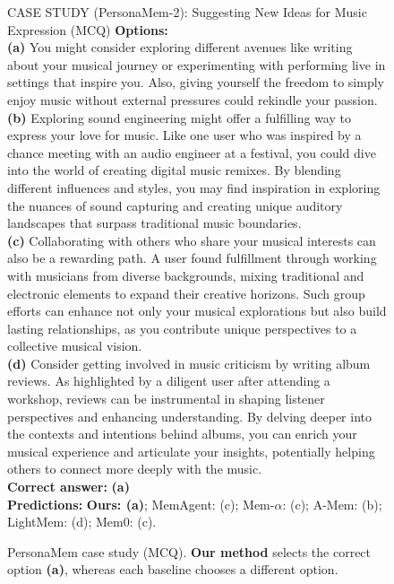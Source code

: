 \begin{figure}[!t]
\begin{AIboxRedFrame}{CASE STUDY (PersonaMem-2): Suggesting New Ideas for Music Expression (MCQ)}
{\textbf{Options:} \\
\textbf{(a)} You might consider exploring different avenues like writing about your musical journey or experimenting with performing live in settings that inspire you. Also, giving yourself the freedom to simply enjoy music without external pressures could rekindle your passion. \\
\textbf{(b)} Exploring sound engineering might offer a fulfilling way to express your love for music. Like one user who was inspired by a chance meeting with an audio engineer at a festival, you could dive into the world of creating digital music remixes. By blending different influences and styles, you may find inspiration in exploring the nuances of sound capturing and creating unique auditory landscapes that surpass traditional music boundaries. \\
\textbf{(c)} Collaborating with others who share your musical interests can also be a rewarding path. A user found fulfillment through working with musicians from diverse backgrounds, mixing traditional and electronic elements to expand their creative horizons. Such group efforts can enhance not only your musical explorations but also build lasting relationships, as you contribute unique perspectives to a collective musical vision. \\
\textbf{(d)} Consider getting involved in music criticism by writing album reviews. As highlighted by a diligent user after attending a workshop, reviews can be instrumental in shaping listener perspectives and enhancing understanding. By delving deeper into the contexts and intentions behind albums, you can enrich your musical experience and articulate your insights, potentially helping others to connect more deeply with the music. \\

\textbf{Correct answer:} \textbf{(a)} \\
\textbf{Predictions:} \textbf{Ours: (a)}; MemAgent: (c); Mem-$\alpha$: (c); A-Mem: (b); LightMem: (d); Mem0: (c).
}
\end{AIboxRedFrame}
\vspace{-1em}
\caption{PersonaMem case study (MCQ). \textbf{Our method} selects the correct option \textbf{(a)}, whereas each baseline chooses a different option.}
\label{fig:case_pm2_fulfill}
\end{figure}

